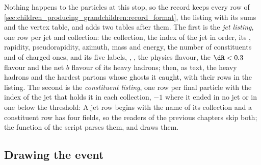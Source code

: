 Nothing happens to the particles at this stop, so the record keeps every
row of \cref{sec:children_producing_grandchildren:record_format}, the
listing with its sums and the vertex table, and adds two tables after
them. The first is the \emph{jet listing}, one row per jet and
collection: the collection, the index of the jet in \pt order, its \pt,
rapidity, pseudorapidity, azimuth, mass and energy, the number of
constituents and of charged ones, and its five labels, \hadflav,
\partflav, the physics flavour, the $\dR<0.3$ flavour and the net $b$
flavour of its heavy hadrons; then, as text, the heavy hadrons and the
hardest partons whose ghosts it caught, with their rows in the listing.
The second is the \emph{constituent listing}, one row per final particle
with the index of the jet that holds it in each collection, $-1$ where it
ended in no jet or in one below the threshold:
A jet row begins with the name of its collection and a constituent row
has four fields, so the readers of the previous chapters skip both; the
function  of the script parses them, and
 draws them.

\subsection{Drawing the event}

